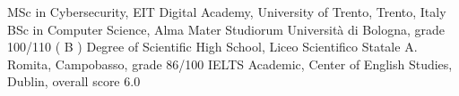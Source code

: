 %
%
%


\begin{scholarship}
	{MSc in Cybersecurity, EIT Digital Academy, University of Trento, Trento, Italy }
					{BSc in Computer Science, Alma Mater Studiorum Universit\`a di Bologna, grade 100/110 ( B ) }
					{Degree of Scientific High School, Liceo Scientifico Statale A. Romita, Campobasso, grade 86/100}
					{IELTS Academic, Center of English Studies, Dublin, overall score 6.0}
\end{scholarship}
